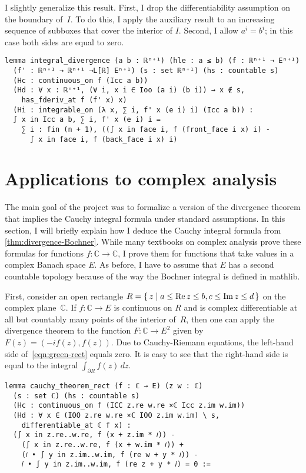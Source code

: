 \documentclass[a4paper, UKenglish,cleveref, autoref, thm-restate]{lipics-v2021}
\newcommand{\bbC}{\mathbb{C}}
\begin{document}
I slightly generalize this result. First, I drop the differentiability
assumption on the boundary of~\(I\). To do this, I apply the auxiliary
result to an increasing sequence of subboxes that cover the interior
of \(I\). Second, I allow \(a^{i}=b^{i}\); in this case both sides are
equal to zero.

\begin{lstlisting}[caption={The divergence theorem for the Bochner integral},label=lst:divergence-bochner]
lemma integral_divergence (a b : ℝⁿ⁺¹) (hle : a ≤ b) (f : ℝⁿ⁺¹ → Eⁿ⁺¹)
  (f' : ℝⁿ⁺¹ → ℝⁿ⁺¹ →L[ℝ] Eⁿ⁺¹) (s : set ℝⁿ⁺¹) (hs : countable s)
  (Hc : continuous_on f (Icc a b))
  (Hd : ∀ x : ℝⁿ⁺¹, (∀ i, x i ∈ Ioo (a i) (b i)) → x ∉ s,
    has_fderiv_at f (f' x) x)
  (Hi : integrable_on (λ x, ∑ i, f' x (e i) i) (Icc a b)) :
  ∫ x in Icc a b, ∑ i, f' x (e i) i =
    ∑ i : fin (n + 1), ((∫ x in face i, f (front_face i x) i) -
      ∫ x in face i, f (back_face i x) i)
\end{lstlisting}

\section{Applications to complex analysis}%
\label{sec:appl-compl-analys}

The main goal of the project was to formalize a version of the
divergence theorem that implies the Cauchy integral formula under
standard assumptions. In this section, I will briefly explain how I
deduce the Cauchy integral formula from
\autoref{thm:divergence-Bochner}. While many textbooks on complex
analysis prove these formulas for functions \(f\colon \bbC\to \bbC\), I
prove them for functions that take values in a complex Banach space
\(E\). As before, I have to assume that \(E\) has a second countable
topology because of the way the Bochner integral is defined in
mathlib.

First, consider an open rectangle
\(R=\set{z|a\le \operatorname{Re}z\le b,c\le \operatorname{Im}z\le d}\) on the complex
plane~\(\bbC\). If \(f\colon \bbC\to E\) is continuous on \(R\) and is
complex differentiable at all but countably many points of the
interior of~\(R\), then one can apply the divergence theorem to the
function \(F\colon \bbC \to E^{2}\) given by \(F(z)=(-if(z),
f(z))\). Due to Cauchy-Riemann equations, the left-hand side
of~\eqref{eqn:green-rect} equals zero. It is easy to see that the
right-hand side is equal to the integral
\(\int_{\partial R}f(z)\,dz\).

\begin{lstlisting}[caption={The Cauchy-Goursat theorem for a rectangle},label=lst:cauchy-rect]
lemma cauchy_theorem_rect (f : ℂ → E) (z w : ℂ)
  (s : set ℂ) (hs : countable s)
  (Hc : continuous_on f (ICC z.re w.re ×ℂ Icc z.im w.im))
  (Hd : ∀ x ∈ (IOO z.re w.re ×ℂ IOO z.im w.im) \ s,
    differentiable_at ℂ f x) :
  (∫ x in z.re..w.re, f (x + z.im * 𝑖)) -
    (∫ x in z.re..w.re, f (x + w.im * 𝑖)) +
    (𝑖 • ∫ y in z.im..w.im, f (re w + y * 𝑖)) -
    𝑖 • ∫ y in z.im..w.im, f (re z + y * 𝑖) = 0 :=
\end{lstlisting}
\end{document}

